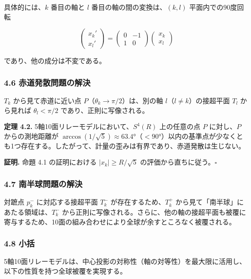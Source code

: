 \documentclass[a4paper,11pt]{ltjsarticle}
\begin{document}
具体的には、\(k\) 番目の軸と \(l\) 番目の軸の間の変換は、\((k, l)\)
平面内での90度回転

\[\begin{pmatrix} x_k' \\ x_l' \end{pmatrix} = \begin{pmatrix} 0 & -1 \\ 1 & 0 \end{pmatrix} \begin{pmatrix} x_k \\ x_l \end{pmatrix}\]

であり、他の成分は不変である。

\subsubsection{4.6
赤道発散問題の解決}\label{ux8d64ux9053ux767aux6563ux554fux984cux306eux89e3ux6c7a}

\(T_k\) から見て赤道に近い点 \(P\)（\(\theta_k \to \pi/2\)）は、別の軸
\(l\)（\(l \neq k\)）の接超平面 \(T_l\) から見れば \(\theta_l < \pi/2\)
であり、正則に写像される。

\textbf{定理 4.2.} 5軸10面リレーモデルにおいて、\(S^4(R)\) 上の任意の点
\(P\) に対し、\(P\) からの測地距離が
\(\arccos(1/\sqrt{5}) \approx 63.4°\)（\(< 90°\)）以内の基準点が少なくとも1つ存在する。したがって、計量の歪みは有界であり、赤道発散は生じない。

\textbf{証明.} 命題 4.1 の証明における \(|x_k| \geq R/\sqrt{5}\)
の評価から直ちに従う。\(\square\)

\subsubsection{4.7
南半球問題の解決}\label{ux5357ux534aux7403ux554fux984cux306eux89e3ux6c7a}

対蹠点 \(p_k^-\) に対応する接超平面 \(T_k^-\) が存在するため、\(T_k^+\)
から見て「南半球」にあたる領域は、\(T_k^-\)
から正則に写像される。さらに、他の軸の接超平面も被覆に寄与するため、10面の組み合わせにより全球が余すところなく被覆される。

\subsubsection{4.8 小括}\label{ux5c0fux62ec}

5軸10面リレーモデルは、中心投影の対称性（軸の対等性）を最大限に活用し、以下の性質を持つ全球被覆を実現する。
\end{document}
